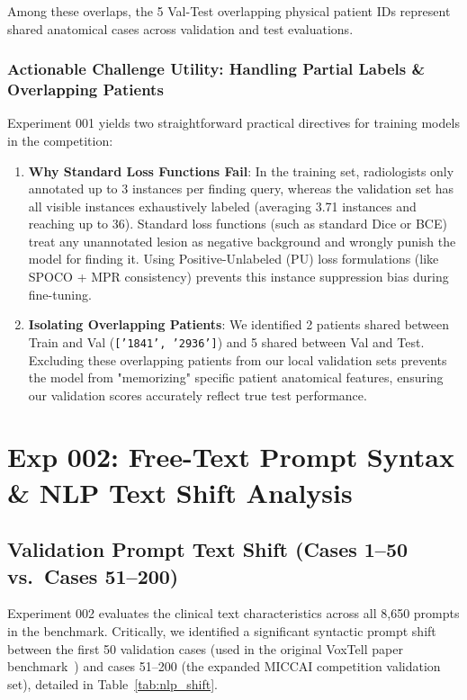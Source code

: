 \documentclass[11pt,a4paper]{article}
\begin{document}
Among these overlaps, the 5 Val-Test overlapping physical patient IDs represent shared anatomical cases across validation and test evaluations.

\subsubsection*{Actionable Challenge Utility: Handling Partial Labels \& Overlapping Patients}
Experiment 001 yields two straightforward practical directives for training models in the competition:
\begin{enumerate}
    \item \textbf{Why Standard Loss Functions Fail}: In the training set, radiologists only annotated up to 3 instances per finding query, whereas the validation set has all visible instances exhaustively labeled (averaging 3.71 instances and reaching up to 36). Standard loss functions (such as standard Dice or BCE) treat any unannotated lesion as negative background and wrongly punish the model for finding it. Using Positive-Unlabeled (PU) loss formulations (like SPOCO + MPR consistency) prevents this instance suppression bias during fine-tuning.
    \item \textbf{Isolating Overlapping Patients}: We identified 2 patients shared between Train and Val (\texttt{['1841', '2936']}) and 5 shared between Val and Test. Excluding these overlapping patients from our local validation sets prevents the model from "memorizing" specific patient anatomical features, ensuring our validation scores accurately reflect true test performance.
\end{enumerate}

\section{Exp 002: Free-Text Prompt Syntax \& NLP Text Shift Analysis}

\subsection{Validation Prompt Text Shift (Cases 1--50 vs.\ Cases 51--200)}
Experiment 002 evaluates the clinical text characteristics across all 8,650 prompts in the benchmark. Critically, we identified a significant syntactic prompt shift between the first 50 validation cases (used in the original VoxTell paper benchmark~\cite{luo2025voxtell}) and cases 51--200 (the expanded MICCAI competition validation set), detailed in Table~\ref{tab:nlp_shift}.
\end{document}
